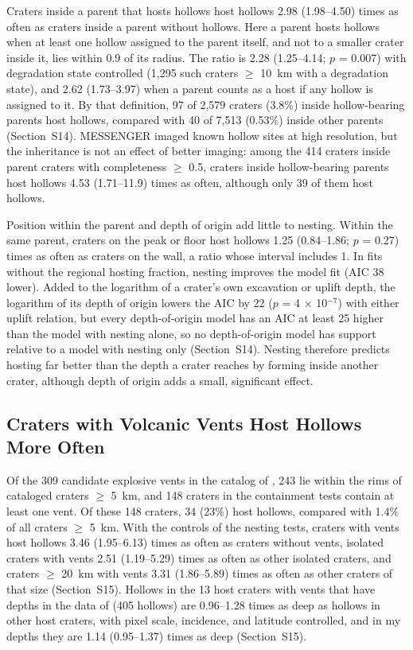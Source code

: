 \documentclass[article,review]{planetary}
\begin{document}
Craters inside a parent that hosts hollows host hollows 2.98 (1.98--4.50) times as often as craters inside a parent without hollows. Here a parent hosts hollows when at least one hollow assigned to the parent itself, and not to a smaller crater inside it, lies within 0.9 of its radius. The ratio is 2.28 (1.25--4.14; $p$ = 0.007) with degradation state controlled (1,295 such craters $\geq$ 10~km with a degradation state), and 2.62 (1.73--3.97) when a parent counts as a host if any hollow is assigned to it. By that definition, 97 of 2,579 craters (3.8\%) inside hollow-bearing parents host hollows, compared with 40 of 7,513 (0.53\%) inside other parents (Section~S14). MESSENGER imaged known hollow sites at high resolution, but the inheritance is not an effect of better imaging: among the 414 craters inside parent craters with completeness $\geq$ 0.5, craters inside hollow-bearing parents host hollows 4.53 (1.71--11.9) times as often, although only 39 of them host hollows.

Position within the parent and depth of origin add little to nesting. Within the same parent, craters on the peak or floor host hollows 1.25 (0.84--1.86; $p$ = 0.27) times as often as craters on the wall, a ratio whose interval includes 1. In fits without the regional hosting fraction, nesting improves the model fit (AIC 38 lower). Added to the logarithm of a crater's own excavation or uplift depth, the logarithm of its depth of origin lowers the AIC by 22 ($p$ = 4 $\times$ 10$^{-7}$) with either uplift relation, but every depth-of-origin model has an AIC at least 25 higher than the model with nesting alone, so no depth-of-origin model has support relative to a model with nesting only (Section~S14). Nesting therefore predicts hosting far better than the depth a crater reaches by forming inside another crater, although depth of origin adds a small, significant effect.

\FloatBarrier
\subsection{Craters with Volcanic Vents Host Hollows More Often}
\label{sec:vents}
Of the 309 candidate explosive vents in the catalog of \textcite{pegg2021}, 243 lie within the rims of cataloged craters $\geq$ 5~km, and 148 craters in the containment tests contain at least one vent. Of these 148 craters, 34 (23\%) host hollows, compared with 1.4\% of all craters $\geq$ 5~km. With the controls of the nesting tests, craters with vents host hollows 3.46 (1.95--6.13) times as often as craters without vents, isolated craters with vents 2.51 (1.19--5.29) times as often as other isolated craters, and craters $\geq$ 20~km with vents 3.31 (1.86--5.89) times as often as other craters of that size (Section~S15). Hollows in the 13 host craters with vents that have depths in the data of \textcite{blewett2016} (405 hollows) are 0.96--1.28 times as deep as hollows in other host craters, with pixel scale, incidence, and latitude controlled, and in my depths they are 1.14 (0.95--1.37) times as deep (Section~S15).
\end{document}
